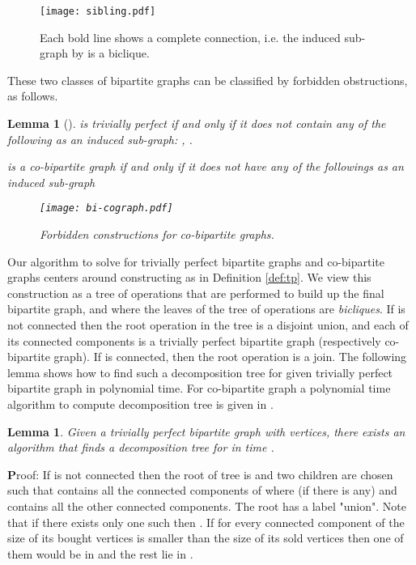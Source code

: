 \documentclass[letterpaper,11pt,abstracton]{scrartcl}
\newcommand{\pf}{{\textbf Proof: }}
\newtheorem{lemma}[theorem]{Lemma}
\begin{document}
\begin{figure}[htbp]
 \begin{center}
\texttt{[image: sibling.pdf]}
\caption{
Each bold line shows a complete connection, i.e. the induced sub-graph
by  is a biclique.
}
    \label{fig:sibling}
  \end{center}
 \end{figure}
These two classes of bipartite graphs can be classified by forbidden obstructions, as follows.

\begin{lemma}[\cite{EKLT12,GV97}] \label{lm:obstruct}
   is trivially perfect if and only if it does not contain any of the
  following as an induced sub-graph: , .

   is a co-bipartite graph if and only if it does not have any of the
  followings as an induced sub-graph 

\begin{figure}[htbp]
 \begin{center}
\texttt{[image: bi-cograph.pdf]}
\caption{
\footnotesize{Forbidden constructions for co-bipartite graphs.
 }
}
  \end{center}
 \end{figure}
\end{lemma}
Our algorithm to solve  for trivially perfect bipartite graphs and co-bipartite graphs
centers around constructing  as in Definition \ref{def:tp}.  We view this
construction as a tree of operations that are performed to build up the final
bipartite graph, and where the leaves of the tree of operations are \emph{bicliques}.
If  is not connected then the root operation in the tree is a disjoint
union, and each of its connected components is a trivially perfect
bipartite graph (respectively co-bipartite graph).  If  is connected, then the root operation is a
join. The following lemma shows how to find such a decomposition tree for given trivially perfect bipartite graph in polynomial time. For co-bipartite graph  a polynomial time algorithm to compute decomposition tree is given in \cite{GV97}.



\begin{lemma}\label{lm:make-tree}
  Given a trivially perfect bipartite graph  with  vertices, there exists an algorithm that finds a decomposition tree for  in 
  time .
\end{lemma}
\pf If  is not connected then the root of tree  is  and
two children  are chosen such that  contains all the connected components  of  where  (if there is any)
and  contains all the other connected components. The root has a label "union". Note that if there exists only one such  then .
If for every connected component of  the size of its bought vertices is smaller than the size of its sold vertices then one of them would be in  and the rest lie in .
\end{document}
